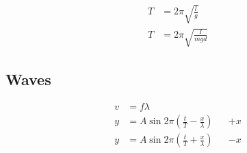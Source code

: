 \documentclass[10pt]{article}
\begin{document}
\begin{multicols*}{4}
\begin{align*}
    T &= 2\pi \sqrt{\frac{l}{g}}\\
    T &= 2\pi \sqrt{\frac{I}{mgd}}
\end{align*}

\subsection{Waves}

\begin{align*}
    v &= f\lambda\\
    y &= A \sin 2\pi \left({\frac{t}{T} - \frac{x}{\lambda}}\right) &&
    +x\\
    y &= A \sin 2\pi \left({\frac{t}{T} + \frac{x}{\lambda}}\right) &&
    -x
\end{align*}

\end{multicols*}
\end{document}
